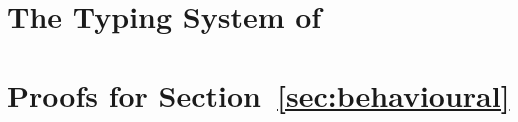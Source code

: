 \documentclass[smallcondensed]{svjour3}
\begin{document}
\newpage
\appendix 
%

\section{The Typing System of \HOp}
\label{app:types}


\section{Proofs for Section~\ref{sec:behavioural}}
\label{app:beh}


%
\end{document}
